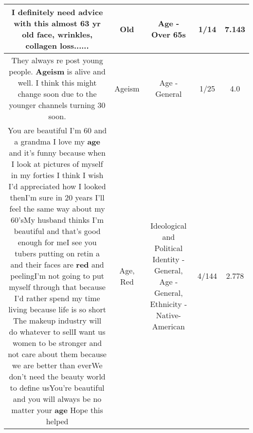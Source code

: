 \documentclass[11pt]{article}
\newlength\mylength
\begin{document}
\begin{center}
\begin{longtable}{|C{.65\mylength}|C{.30\mylength}|C{.12\mylength}|C{.12\mylength}|C{.12\mylength}|}
  \small I definitely need advice with this almost 63 yr \textbf{old} face, wrinkles, collagen loss......\normalsize   & Old & Age - Over 65s & 1/14 & 7.143 \\  \hline
  \small They always re post young people. \textbf{Ageism} is alive and well. I think this might change soon due to the younger channels turning 30 soon.\normalsize   & Ageism & Age - General & 1/25 & 4.0 \\  \hline
  \small You are beautiful I'm 60 and a grandma I love my \textbf{age} and it's funny because when I look at pictures of myself in my forties I think I wish I'd appreciated how I looked thenI'm sure in 20 years I'll feel the same way about my 60'sMy husband thinks I'm beautiful and that's good enough for meI see you tubers putting on retin a and their faces are \textbf{r\textbf{ed}} and peelingI'm not going to put myself through that because I'd rather spend my time living because life is so short The makeup industry will do whatever to sellI want us women to be stronger and not care about them because we are better than everWe don't need the beauty world to define usYou're beautiful and you will always be no matter your \textbf{age} Hope this helped\normalsize   & Age, Red &  Ideological and Political Identity - General, Age - General, Ethnicity - Native-American & 4/144 & 2.778 \\  \hline

\end{longtable}
\end{center}
\end{document}
